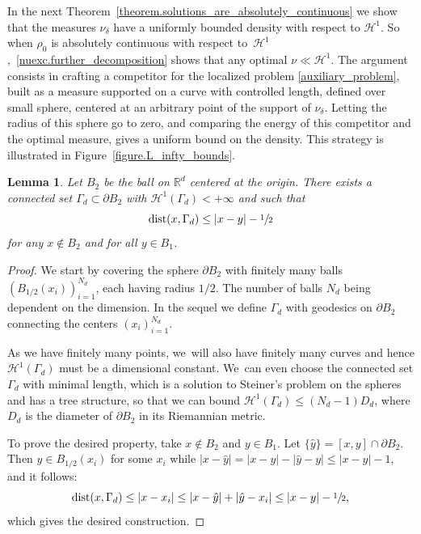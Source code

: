 \documentclass[JEP,XML,SOM,Unicode,NoFloatCountersInSection,published]{cedram}
\newtheorem{lemma}[theorem]{Lemma}
\theoremstyle{definition}
\newcommand\cH{\mathcal{H}}
\newcommand{\RR}{\mathbb{R}}
\DeclareMathOperator{\dist}{dist}
\begin{document}
In the next Theorem~\ref{theorem.solutions_are_absolutely_continuous} we show that the measures $\nu_\delta$ have a uniformly
bounded density with respect to $\cH^1$. So when $\rho_0$ is absolutely continuous with respect to~$\cH^1$,~\eqref{nuexc.further_decomposition}
shows that any optimal $\nu \ll \cH^1$.
The argument consists in crafting a competitor for the
localized problem \eqref{auxiliary_problem}, built as a measure supported on a curve with controlled length, defined over small sphere, centered at an arbitrary point of the support of $\nu_\delta$. Letting the radius of this sphere go to zero, and comparing the energy of this competitor and the optimal measure, gives a uniform bound on the density.
This strategy is illustrated in Figure~\ref{figure.L_infty_bounds}.

\begin{lemma}\label{lemma.curve_on_B2}
Let $B_2$ be the ball on $\RR^d$ centered at the origin. There exists a connected set $\Gamma_d \subset \partial B_2$ with $\cH^1(\Gamma_d) < +\infty$ and such that\vspace*{-3pt}
\[
\dist(x, \Gamma_d) \le |x - y| - \sfrac{1}{2}
\]
for any $x \not\in B_2$ and for all $y \in B_1$.
\end{lemma}

\begin{proof}
We start by covering the sphere $\partial B_2$ with finitely many balls $\left(B_{1/2}(x_i)\right)_{i = 1}^{N_d}$, each having radius $1/2$. The number of balls $N_d$ being dependent on the dimension. In the sequel we define $\Gamma_d$ with geodesics on $\partial B_2$ connecting the centers $\left(x_i\right)_{i = 1}^{N_d}$.

As we have finitely many points, we~will also have finitely many curves and hence $\cH^1(\Gamma_d)$ must be a dimensional constant. We~can even choose the connected set $\Gamma_d$ with minimal length,
which is a solution to Steiner's problem on the spheres and has a tree structure,
so that we can bound $\cH^1(\Gamma_d) \le (N_d - 1)D_d$, where $D_d$ is the diameter of $\partial B_2$ in its Riemannian metric.

To prove the desired property, take $x \not\in B_2$ and $y \in B_1$. Let $\{\hat y\} = [x,y]\cap \partial B_2$. Then $\hat y \in B_{1/2}(x_i)$ for some $x_i$
while $|x-\hat y|=|x-y|-|\hat y-y|\le |x-y|-1$, and it follows:
\[
\dist(x, \Gamma_d)
\le |x - x_i|
\le |x - \hat y| + |\hat y - x_i|
\le |x - y| - \sfrac{1}{2},
\]
which gives the desired construction.
\end{proof}
\end{document}
